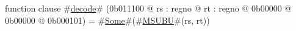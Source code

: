function clause #\hyperref[zdecode]{decode}# (0b011100 @ rs : regno @ rt : regno @ 0b00000 @ 0b00000 @ 0b000101) =
  #\hyperref[zSome]{Some}#(#\hyperref[zMSUBU]{MSUBU}#(rs, rt))
